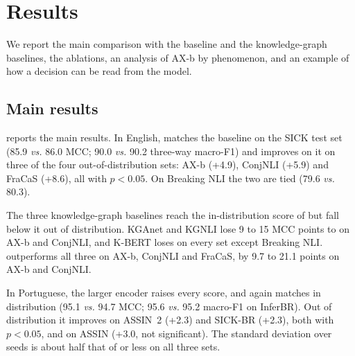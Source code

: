 \section{Results}
\label{sec:results}

We report the main comparison with the \cls{} baseline and the knowledge-graph baselines, the
ablations, an analysis of AX-b by phenomenon, and an example of how a decision can be read from the model.

\subsection{Main results}
\label{sec:main-results}

\begin{table}[t]
  \centering\footnotesize\setlength{\tabcolsep}{3pt}
  
  \caption{Main results: MCC of \E{} \emph{vs.} $\neg$\E{} ($\times100$), mean and seed standard deviation
  over 10 seeds; best per group in bold. Each half of a row comes from the model trained for that half;
  cross-lingual rows are zero-shot transfer. $^{\dagger}$Paired Wilcoxon $p<0.05$ against \cls{}.
  }
  \label{tab:main}
\end{table}

 reports the main results. In English, \model{} matches the \cls{} baseline on the SICK
test set (85.9 \emph{vs.} 86.0 MCC; 90.0 \emph{vs.} 90.2 three-way macro-F1) and improves on it on three
of the four out-of-distribution sets: AX-b (+4.9), ConjNLI (+5.9) and FraCaS (+8.6), all with
$p<0.05$. On Breaking NLI the two are tied (79.6 \emph{vs.} 80.3).

The three knowledge-graph baselines reach the in-distribution score of \cls{} but fall below it out of
distribution. KGAnet and KGNLI lose 9 to 15 MCC points to \cls{} on AX-b and ConjNLI, and K-BERT loses on
every set except Breaking NLI. \model{} outperforms all three on AX-b, ConjNLI and FraCaS, by 9.7 to 21.1 points on AX-b
and ConjNLI.

In Portuguese, the larger encoder raises every score, and \model{} again matches \cls{} in distribution
(95.1 \emph{vs.} 94.7 MCC; 95.6 \emph{vs.} 95.2 macro-F1 on InferBR). Out of distribution it improves on
ASSIN~2 (+2.3) and SICK-BR (+2.3), both with $p<0.05$, and on ASSIN (+3.0, not significant). The
standard deviation over seeds is about half that of \cls{} or less on all three sets.

